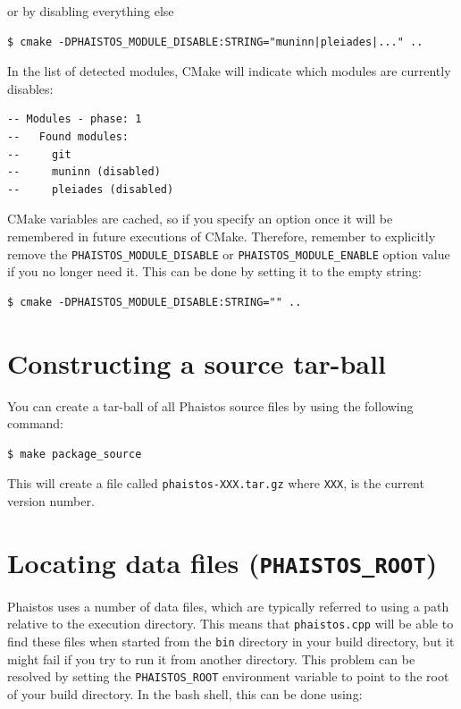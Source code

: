 \documentclass[11pt,a4paper,twoside]{book}
\begin{document}
\noindent
or by disabling everything else

\begin{verbatim}
$ cmake -DPHAISTOS_MODULE_DISABLE:STRING="muninn|pleiades|..." ..
\end{verbatim}

\noindent
In the list of detected modules, CMake will indicate which modules are
currently disables:

\begin{verbatim}
-- Modules - phase: 1
--   Found modules:
--     git
--     muninn (disabled)
--     pleiades (disabled)
\end{verbatim}

CMake variables are cached, so if you specify an option once it will
be remembered in future executions of CMake. Therefore, remember to
explicitly remove the \texttt{PHAISTOS\_MODULE\_DISABLE} or
\texttt{PHAISTOS\_MODULE\_ENABLE} option value if you no longer need
it. This can be done by setting it to the empty string:

\begin{verbatim}
$ cmake -DPHAISTOS_MODULE_DISABLE:STRING="" ..
\end{verbatim}

\section{Constructing a source tar-ball}
\label{sec:constr-source-tar}

You can create a tar-ball of all Phaistos source files by using the
following command:

\begin{verbatim}
$ make package_source
\end{verbatim}

\noindent
This will create a file called \texttt{phaistos-XXX.tar.gz} where
\texttt{XXX}, is the current version number.

\section{Locating data files (\texttt{PHAISTOS\_ROOT})}
\label{sec:locating-data-files}

Phaistos uses a number of data files, which are typically referred to
using a path relative to the execution directory. This means that
\texttt{phaistos.cpp} will be able to find these files when started
from the \texttt{bin} directory in your build directory, but it might
fail if you try to run it from another directory. This problem can be
resolved by setting the \texttt{PHAISTOS\_ROOT} environment variable
to point to the root of your build directory. In the bash shell, this
can be done using:
\end{document}
